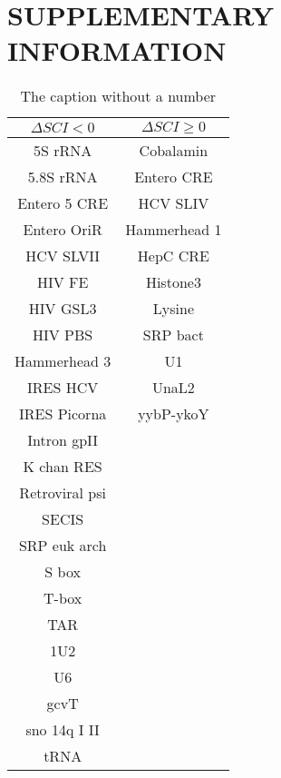 \documentclass[a4paper,twoside]{article}
\begin{document}
\section*{\uppercase{Supplementary Information}}

\begin{table}
\caption{Table Title}
\begin{tabular}{|c|c|}
\hline 
$\Delta{} SCI < 0$  & $\Delta{} SCI \geq 0$ \\ 
\hline 
5S rRNA & Cobalamin \\
5.8S rRNA & Entero CRE \\
Entero 5 CRE & HCV SLIV \\
Entero OriR & Hammerhead 1 \\
HCV SLVII & HepC CRE \\
HIV FE & Histone3 \\
HIV GSL3 & Lysine\\
HIV PBS & SRP bact \\
Hammerhead 3 & U1 \\
IRES HCV & UnaL2 \\
IRES Picorna & yybP-ykoY \\
Intron gpII & \\
K chan RES & \\
Retroviral psi & \\
SECIS & \\
SRP euk arch & \\
S box & \\
T-box & \\
TAR & \\
1U2 & \\
U6 & \\
gcvT & \\
sno 14q I II & \\
tRNA & \\
\hline 
\end{tabular} 
\\[10pt]
\caption*{The caption without a number}
\end{table}
\end{document}
